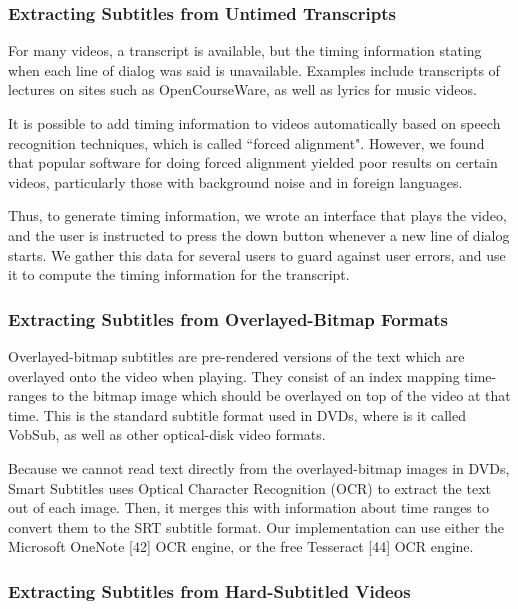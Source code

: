 \documentclass{sigchi}
\begin{document}
\subsubsection{Extracting Subtitles from Untimed Transcripts}

For many videos, a transcript is available, but the timing information
stating when each line of dialog was said is unavailable.
Examples include transcripts of lectures on sites such as
OpenCourseWare, as well as lyrics for music videos.

It is possible to add timing information to videos automatically based on speech recognition techniques, which is called ``forced alignment".
However, we found that popular software for doing forced alignment
yielded poor results on certain videos, particularly those with background
noise and in foreign languages.

Thus, to generate timing information,
we wrote an interface that plays the video,
and the user is instructed to press the down button whenever a new
line of dialog starts.
We gather this data for several users to guard against user errors,
and use it to compute the timing information for the transcript.

\subsubsection{Extracting Subtitles from Overlayed-Bitmap Formats}

Overlayed-bitmap subtitles are pre-rendered versions of the text which are overlayed onto the video when playing. They consist of an index mapping time-ranges to the bitmap image which should be overlayed on top of the video at that time. This is the standard subtitle format used in DVDs, where is it called VobSub, as well as other optical-disk video formats.

Because we cannot read text directly from the overlayed-bitmap images in DVDs, Smart Subtitles uses Optical Character Recognition (OCR) to extract the text out of each image. Then, it merges this with information about time ranges to convert them to the SRT subtitle format. Our implementation can use either the Microsoft OneNote [42] OCR engine, or the free Tesseract [44] OCR engine.

\subsubsection{Extracting Subtitles from Hard-Subtitled Videos}
\end{document}

